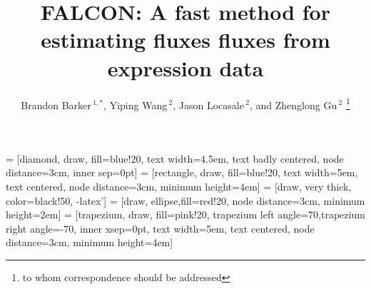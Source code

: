 \documentclass{bioinfo}
\theoremstyle{break}
\theoremstyle{empty}
\begin{document}

\title[short Title]{FALCON: A fast method for estimating fluxes fluxes
  from expression data} 
  \author[Sample \textit{et~al}]{Brandon Barker\,$^{1,*}$, 
    Yiping Wang\,$^{2}$, Jason Locasale\,$^{2}$, and
    Zhenglong Gu\,$^2$
    \footnote{to whom correspondence should be addressed}
  }

\address{$^{1}$Tri-Institutional Training Program in
  Computational Biology and Medicine, Address XXXX
  etc.\\ $^{2}$Department of XXXXXXXX, Address XXXX etc.}



\maketitle

\usetikzlibrary{shapes,arrows}
 = [diamond, draw, fill=blue!20,
    text width=4.5em, text badly centered, node distance=3cm, inner sep=0pt]
 = [rectangle, draw, fill=blue!20,
    text width=5em, text centered, node distance=3cm, minimum height=4em]
 = [draw, very thick, color=black!50, -latex']
 = [draw, ellipse,fill=red!20, node distance=3cm,
    minimum height=2em]
 = [trapezium, draw, fill=pink!20,
    trapezium left angle=70,trapezium right angle=-70, inner xsep=0pt,
    text width=5em, text centered, node distance=3cm, minimum height=4em]
\end{document}
